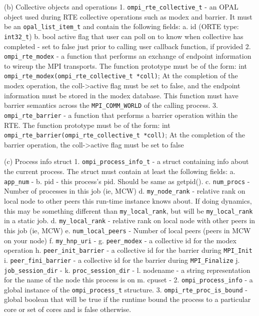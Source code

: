  (b) Collective objects and operations
     1. \verb|ompi_rte_collective_t| - an OPAL object used during RTE collective operations such as modex and barrier. It must be an \verb|opal_list_item_t| and contain the following fields:
           a. id (ORTE type: \verb|int32_t|)
           b. bool active
              flag that user can poll on to know when collective
              has completed - set to false just prior to
              calling user callback function, if provided
     2. \verb|ompi_rte_modex| - a function that performs an exchange of endpoint information to wireup the MPI transports. The function prototype must be of the form:
        int \verb|ompi_rte_modex(ompi_rte_collective_t *coll)|;
        At the completion of the modex operation, the coll->active flag must be set to false, and the endpoint information must be stored in the modex database.
        This function must have barrier semantics across the \verb|MPI_COMM_WORLD| of the calling process.
     3. \verb|ompi_rte_barrier| - a function that performs a barrier operation within the RTE. The function prototype must be of the form:
        int \verb|ompi_rte_barrier(ompi_rte_collective_t *coll)|;
        At the completion of the barrier operation, the coll->active flag must be set to false

 (c) Process info struct
     1. \verb|ompi_process_info_t| - a struct containing info about the current process.
        The struct must contain at least the following fields:
           a. \verb|app_num| -
           b. pid - this process's pid.  Should be same as getpid().
           c. \verb|num_procs| - Number of processes in this job (ie, MCW)
           d. \verb|my_node_rank| - relative rank on local node to other peers this run-time instance knows about.  If doing dynamics, this may be something different than \verb|my_local_rank|, but will be \verb|my_local_rank| in a static job.
           d. \verb|my_local_rank| - relative rank on local node with other peers in this job (ie, MCW)
           e. \verb|num_local_peers| - Number of local peers (peers in MCW on your node)
           f. \verb|my_hnp_uri| -
           g. \verb|peer_modex| - a collective id for the modex operation
           h. \verb|peer_init_barrier| - a collective id for the barrier during \verb|MPI_Init|
           i. \verb|peer_fini_barrier| - a collective id for the barrier during \verb|MPI_Finalize|
           j. \verb|job_session_dir| -
           k. \verb|proc_session_dir| -
           l. nodename - a string representation for the name of the node this
              process is on
           m. cpuset -
     2. \verb|ompi_process_info| - a global instance of the \verb|ompi_process_t| structure.
     3. \verb|ompi_rte_proc_is_bound| - global boolean that will be true if the runtime bound the process to a particular core or set of cores and is false otherwise.

